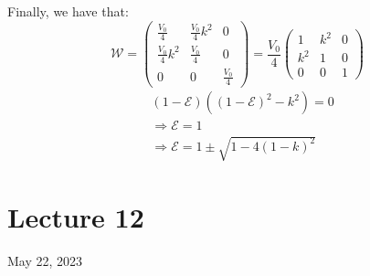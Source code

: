 \documentclass[12pt,fancychapters]{report}
\numberwithin{equation}{section}
\begin{document}
Finally, we have that:
\begin{equation}
  \mathcal{W}=
  \begin{pmatrix}
    \frac{V_0}{4} & \frac{V_0}{4} k^2 & 0\\
    \frac{V_0}{4} k^2 & \frac{V_0}{4} & 0\\
    0 & 0 & \frac{V_0}{4}
  \end{pmatrix} =
  \frac{V_0}{4}
  \begin{pmatrix}
    1 & k^2 & 0\\
    k^2 & 1 & 0\\
    0 & 0 & 1
  \end{pmatrix}
\end{equation}
\begin{align*}
  &\left(1-\mathcal{E}\right)\left(\left(1-\mathcal{E}\right)^2 - k^2\right) =0 \\
  & \Rightarrow \mathcal{E} = 1\\
  & \Rightarrow \mathcal{E} = 1 \pm \sqrt{1 - 4(1-k)^2}
\end{align*}
\newpage
\clearpage
\section{Lecture 12}
May 22, 2023
\end{document}

